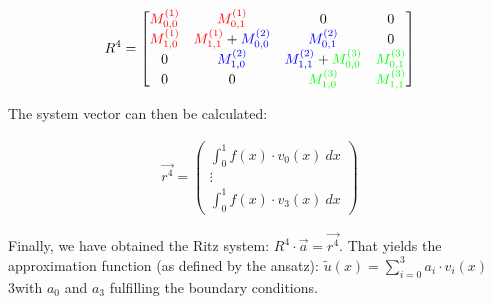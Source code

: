 \begin{align*}
	R^4 = \begin{bmatrix}
		{\color{red} M^{(1)}_{0,0}} & \color{red}{M^{(1)}_{0,1}} & 0 & 0 \\
		{\color{red} M^{(1)}_{1,0}} & {\color{red} M^{(1)}_{1,1}} + {\color{blue} M^{(2)}_{0,0}} & {\color{blue} M^{(2)}_{0,1}} & 0 \\
		0 & {\color{blue} M^{(2)}_{1,0}} & {\color{blue} M^{(2)}_{1,1}} + {\color{green} M^{(3)}_{0,0}} & {\color{green} M^{(3)}_{0,1}} \\
		0 & 0 & {\color{green} M^{(3)}_{1,0}} & {\color{green} M^{(3)}_{1,1}}
	\end{bmatrix}
\end{align*}

The system vector can then be calculated:

\begin{align*}
	\vec{r^4} = \begin{pmatrix}
		\int_0^1 f(x)\cdot v_0(x)\ dx \\
		\vdots \\
		\int_0^1 f(x)\cdot v_3(x)\ dx
	\end{pmatrix}
\end{align*}

Finally, we have obtained the Ritz system: $R^4\cdot\vec{a}=\vec{r^4}$.
That yields the approximation function (as defined by the ansatz): $\tilde{u}(x)=\sum_{i=0}^3 a_i\cdot v_i(x)$
3with $a_0$ and $a_3$ fulfilling the boundary conditions.